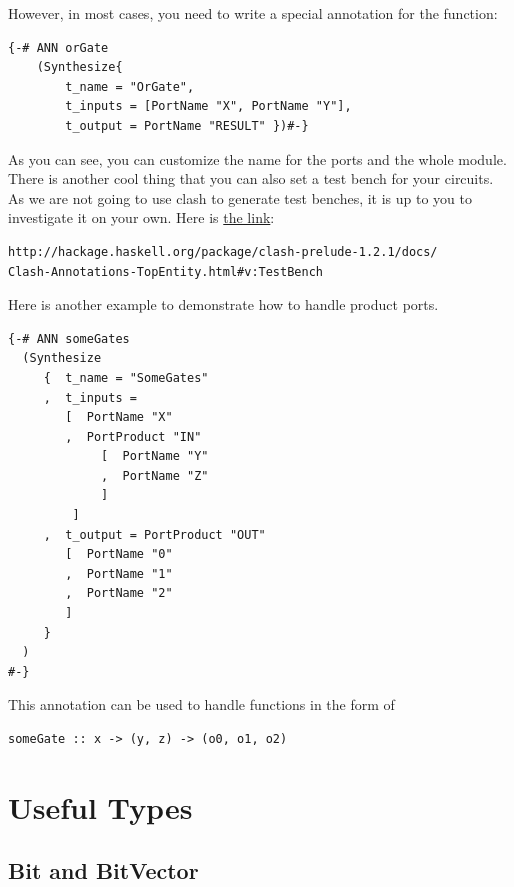 \documentclass[a4paper,12pt, oneside]{book}
\begin{document}
However, in most cases, you need to write a special annotation for the function:
\begin{verbatim}
{-# ANN orGate
    (Synthesize{
        t_name = "OrGate",
        t_inputs = [PortName "X", PortName "Y"],
        t_output = PortName "RESULT" })#-}
\end{verbatim}
As you can see, you can customize the name for the ports and the whole module. There is another cool thing that you can also set a test bench for your circuits. As we are not going to use clash to generate test benches, it is up to you to investigate it on your own. Here is \href{http://hackage.haskell.org/package/clash-prelude-1.2.1/docs/Clash-Annotations-TopEntity.html#v:TestBench}{the link}:

\begin{verbatim}
http://hackage.haskell.org/package/clash-prelude-1.2.1/docs/
Clash-Annotations-TopEntity.html#v:TestBench
\end{verbatim}

Here is another example to demonstrate how to handle product ports.
\begin{verbatim}
{-# ANN someGates
  (Synthesize
     {  t_name = "SomeGates"
     ,  t_inputs = 
        [  PortName "X"
        ,  PortProduct "IN" 
             [  PortName "Y"
             ,  PortName "Z"
             ]
         ]
     ,  t_output = PortProduct "OUT" 
        [  PortName "0"
        ,  PortName "1"
        ,  PortName "2"
        ]
     }
  )
#-}
\end{verbatim}
This annotation can be used to handle functions in the form of 
\begin{verbatim}
someGate :: x -> (y, z) -> (o0, o1, o2)
\end{verbatim} 

\section{Useful Types}
\subsection{Bit and BitVector}
\end{document}
